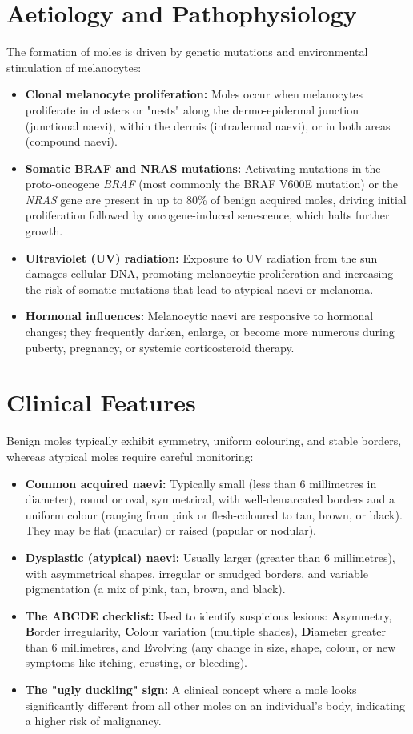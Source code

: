 \section*{Aetiology and Pathophysiology}
The formation of moles is driven by genetic mutations and environmental stimulation of melanocytes:
\begin{itemize}
    \item \textbf{Clonal melanocyte proliferation:} Moles occur when melanocytes proliferate in clusters or "nests" along the dermo-epidermal junction (junctional naevi), within the dermis (intradermal naevi), or in both areas (compound naevi).
    \item \textbf{Somatic BRAF and NRAS mutations:} Activating mutations in the proto-oncogene \textit{BRAF} (most commonly the BRAF V600E mutation) or the \textit{NRAS} gene are present in up to 80\% of benign acquired moles, driving initial proliferation followed by oncogene-induced senescence, which halts further growth.
    \item \textbf{Ultraviolet (UV) radiation:} Exposure to UV radiation from the sun damages cellular DNA, promoting melanocytic proliferation and increasing the risk of somatic mutations that lead to atypical naevi or melanoma.
    \item \textbf{Hormonal influences:} Melanocytic naevi are responsive to hormonal changes; they frequently darken, enlarge, or become more numerous during puberty, pregnancy, or systemic corticosteroid therapy.
\end{itemize}

\section*{Clinical Features}
Benign moles typically exhibit symmetry, uniform colouring, and stable borders, whereas atypical moles require careful monitoring:
\begin{itemize}
    \item \textbf{Common acquired naevi:} Typically small (less than 6 millimetres in diameter), round or oval, symmetrical, with well-demarcated borders and a uniform colour (ranging from pink or flesh-coloured to tan, brown, or black). They may be flat (macular) or raised (papular or nodular).
    \item \textbf{Dysplastic (atypical) naevi:} Usually larger (greater than 6 millimetres), with asymmetrical shapes, irregular or smudged borders, and variable pigmentation (a mix of pink, tan, brown, and black).
    \item \textbf{The ABCDE checklist:} Used to identify suspicious lesions: \textbf{A}symmetry, \textbf{B}order irregularity, \textbf{C}olour variation (multiple shades), \textbf{D}iameter greater than 6 millimetres, and \textbf{E}volving (any change in size, shape, colour, or new symptoms like itching, crusting, or bleeding).
    \item \textbf{The "ugly duckling" sign:} A clinical concept where a mole looks significantly different from all other moles on an individual's body, indicating a higher risk of malignancy.
\end{itemize}


